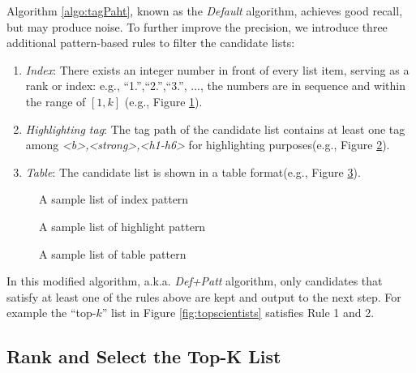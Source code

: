 Algorithm \ref{algo:tagPaht}, known as the {\em Default} algorithm, achieves good
recall, but may produce noise. To further improve the precision,
we introduce three additional pattern-based rules to filter the candidate lists:

\begin{enumerate}
\item \textit{Index}:
There exists an integer number in front of every list item, serving as
a rank or index: e.g., ``1.'',``2.'',``3.'', ..., the numbers are in sequence
and within the range of $[1, k]$ (e.g., Figure \ref{fig:indexPattern}).

\item \textit{Highlighting tag}:
The tag path of the candidate list contains at least one tag
among {\em <b>,<strong>,<h1-h6>} for highlighting purposes(e.g., Figure \ref{fig:highlightPattern}).

\item \textit{Table}:
The candidate list is shown in a table format(e.g., Figure \ref{fig:tablePattern}).
\end{enumerate}

\begin{figure}[th]
\centering
{}
\caption{A sample list of index pattern\cite{Top20Books}}
\label{fig:indexPattern}
\end{figure}

\begin{figure}[th]
\centering
{}
\caption{A sample list of highlight pattern\cite{highlightPattern}}
\label{fig:highlightPattern}
\end{figure}

\begin{figure}[th]
\centering
{}
\caption{A sample list of table pattern\cite{tablePattern}}
\label{fig:tablePattern}
\end{figure}

In this modified algorithm, a.k.a. {\em Def+Patt} algorithm,
only candidates that satisfy at least one of the rules above are
kept and output to the next step.
For example the ``top-$k$'' list in Figure \ref{fig:topscientists}
satisfies Rule 1 and 2.

\subsection{Rank and Select the Top-K List}
\label{sec:ranker}

